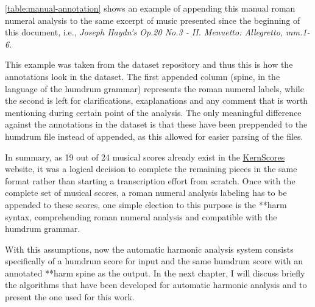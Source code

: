 \autoref{table:manual-annotation} shows an example of appending this manual roman numeral analysis to the same excerpt of music presented since the beginning of this document, i.e., \emph{Joseph Haydn's Op.20 No.3 - II. Menuetto: Allegretto, mm.1-6}.

This example was taken from the dataset repository and thus this is how the annotations look in the dataset. The first appended column (spine, in the language of the humdrum grammar) represents the roman numeral labels, while the second is left for clarifications, exaplanations and any comment that is worth mentioning during certain point of the analysis. The only meaningful difference against the annotations in the dataset is that these have been preppended to the humdrum file instead of appended, as this allowed for easier parsing of the files.

In summary, as 19 out of 24 musical scores already exist in the \href{http://kern.ccarh.org/}{KernScores} website, it was a logical decision to complete the remaining pieces in the same format rather than starting a transcription effort from scratch. Once with the complete set of musical scores, a roman numeral analysis labeling has to be appended to these scores, one simple election to this purpose is the **harm syntax, comprehending roman numeral analysis and compatible with the humdrum grammar.

With this assumptions, now the automatic harmonic analysis system consists specifically of a humdrum score for input and the same humdrum score with an annotated **harm spine as the output. In the next chapter, I will discuss briefly the algorithms that have been developed for automatic harmonic analysis and to present the one used for this work.

\newpage
